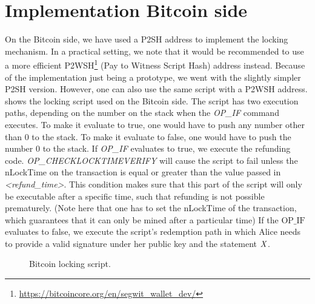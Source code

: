 \section{Implementation Bitcoin side}\label{sec:ImplementationBtc}

On the Bitcoin side, we have used a P2SH address to implement the locking mechanism.
In a practical setting, we note that it would be recommended to use a more efficient P2WSH\footnote{\url{https://bitcoincore.org/en/segwit_wallet_dev/}} (Pay to Witness Script Hash) address instead.
Because of the implementation just being a prototype, we went with the slightly simpler P2SH version.
However, one can also use the same script with a P2WSH address.
 shows the locking script used on the Bitcoin side.
The script has two execution paths, depending on the number on the stack when the \textit{OP\_IF} command executes.
To make it evaluate to true, one would have to push any number other than 0 to the stack.
To make it evaluate to false, one would have to push the number 0 to the stack.
If \textit{OP\_IF} evaluates to true, we execute the refunding code.
\textit{OP\_CHECKLOCKTIMEVERIFY} will cause the script to fail unless the nLockTime on the transaction is equal or greater than the value passed in \textit{<refund\_time>}.
This condition makes sure that this part of the script will only be executable after a specific time, such that refunding is not possible prematurely.
(Note here that one has to set the nLockTime of the transaction, which guarantees that it can only be mined after a particular time)
If the $\text{OP\_IF}$ evaluates to false, we execute the script's redemption path in which Alice needs to provide a valid signature under her public key and the statement $\mathit{X}$.

\begin{figure}
    \begin{center}
    \end{center}
    \caption{Bitcoin locking script.}\label{fig:bitcoin-script}
\end{figure}

